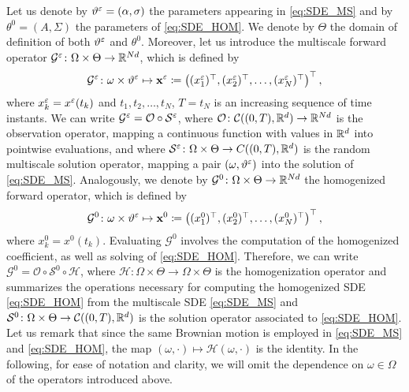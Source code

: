 \documentclass[10pt]{article}
\begin{document}
Let us denote by $\vartheta^\varepsilon = (\alpha, \sigma)$ the parameters appearing in \eqref{eq:SDE_MS} and by $\theta^0 = (A, \Sigma)$ the parameters of \eqref{eq:SDE_HOM}. We denote by $\Theta$ the domain of definition of both $\vartheta^\varepsilon$ and $\theta^0$. Moreover, let us introduce the multiscale forward operator $\mathcal G^\varepsilon \colon \Omega \times \Theta \to \mathbb{R}^{Nd}$, which is defined by
\begin{equation}
	\mathcal G^\varepsilon \colon \omega \times \vartheta^\varepsilon \mapsto \mathbf x^\varepsilon \coloneqq \begin{pmatrix}(x^\varepsilon_1)^\top, (x^\varepsilon_2)^\top, \ldots, (x^\varepsilon_N)^\top \end{pmatrix}^\top,
\end{equation}
where $x_k^\varepsilon = x^\varepsilon(t_k)$ and $t_1, t_2, \ldots, t_N$, $T = t_N$ is an increasing sequence of time instants. We can write $\mathcal G^\varepsilon = \mathcal O \circ \mathcal S^\varepsilon$, where $\mathcal O\colon \mathcal C((0, T), \mathbb{R}^d) \to \mathbb{R}^{Nd}$ is the observation operator, mapping a continuous function with values in $\mathbb{R}^d$ into pointwise evaluations, and where $\mathcal S^\varepsilon \colon \Omega \times \Theta \to C((0, T), \mathbb{R}^d)$ is the random multiscale solution operator, mapping a pair $(\omega, \vartheta^\varepsilon)$ into the solution of \eqref{eq:SDE_MS}. Analogously, we denote by $\mathcal G^0 \colon \Omega \times \Theta \to \mathbb{R}^{Nd}$ the homogenized forward operator, which is defined by
\begin{equation}
	\mathcal G^0 \colon \omega \times \vartheta^\varepsilon \mapsto \mathbf x^0 \coloneqq \begin{pmatrix}(x^0_1)^\top, (x^0_2)^\top, \ldots, (x^0_N)^\top \end{pmatrix}^\top,
\end{equation}
where $x_k^0 = x^0(t_k)$. Evaluating $\mathcal G^0$ involves the computation of the homogenized coefficient, as well as solving of \eqref{eq:SDE_HOM}. Therefore, we can write $\mathcal G^0 = \mathcal O \circ \mathcal S^0 \circ \mathcal H$, where $\mathcal H \colon \Omega \times \Theta \to \Omega \times \Theta$ is the homogenization operator and summarizes the operations necessary for computing the homogenized SDE \eqref{eq:SDE_HOM} from the multiscale SDE \eqref{eq:SDE_MS} and $\mathcal S^0\colon \Omega \times \Theta \to \mathcal C((0, T), \mathbb{R}^d)$ is the solution operator associated to \eqref{eq:SDE_HOM}. Let us remark that since the same Brownian motion is employed in \eqref{eq:SDE_MS} and \eqref{eq:SDE_HOM}, the map $(\omega, \cdot) \mapsto \mathcal H(\omega, \cdot)$ is the identity. In the following, for ease of notation and clarity, we will omit the dependence on $\omega \in \Omega$ of the operators introduced above.
\end{document}
